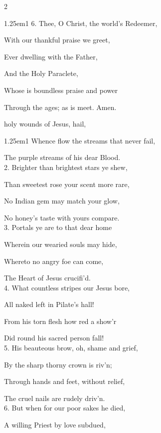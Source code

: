 \begin{paracol}{2}
\begin{hangparas}{1.25em}{1}
6. Thee, O Christ, the world's Redeemer,

With our thankful praise we greet,

Ever dwelling with the Father,

And the Holy Paraclete,

Whose is boundless praise and power

Through the ages; as is meet. Amen.
\end{hangparas}

\switchcolumn

\mattinsOfficeHymn
{} holy wounds of Jesus, hail,


\begin{hangparas}{1.25em}{1}
Whence flow the streams that never fail,

The purple streams of his dear Blood.\\

2. Brighter than brightest stars ye shew,

Than sweetest rose your scent more rare,

No Indian gem may match your glow,

No honey's taste with yours compare.\\

3. Portals ye are to that dear home

Wherein our wearied souls may hide,

Whereto no angry foe can come,

The Heart of Jesus crucifi'd.\\

4. What countless stripes our Jesus bore,

All naked left in Pilate’s hall!

From his torn flesh how red a show'r

Did round his sacred person fall!\\

5. His beauteous brow, oh, shame and grief,

By the sharp thorny crown is riv'n;

Through hands and feet, without relief,

The cruel nails are rudely driv'n.\\

6. But when for our poor sakes he died,

A willing Priest by love subdued,


\end{hangparas}
\end{paracol}
